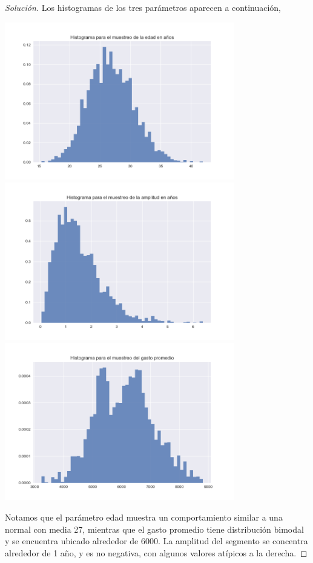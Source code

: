 \documentclass{article}
\begin{document}
\begin{enumerate}
\begin{proof}[Solución]
        Los histogramas de los tres parámetros aparecen a continuación,

        \begin{center}
            \includegraphics[width=0.75\textwidth]{Tarea9/hista.png}
            \includegraphics[width=0.75\textwidth]{Tarea9/histb.png}
            \includegraphics[width=0.75\textwidth]{Tarea9/histc.png}
        \end{center}

        Notamos que el parámetro edad muestra un comportamiento similar a una normal
        con media 27, mientras que el gasto promedio tiene distribución bimodal y se 
        encuentra ubicado alrededor de 6000. La amplitud del segmento se concentra 
        alrededor de 1 año, y es no negativa, con algunos valores atípicos a la derecha.


\end{proof}
\end{enumerate}
\end{document}
